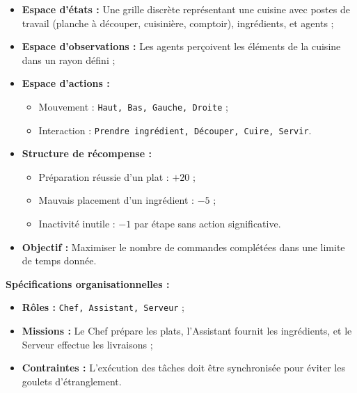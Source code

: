 \documentclass[pdflatex,sn-mathphys-num]{sn-jnl}%
\theoremstyle{thmstyleone}%
\theoremstyle{thmstyletwo}%
\theoremstyle{thmstylethree}%
\begin{document}
\begin{itemize}
    \item \textbf{Espace d'états :} Une grille discrète représentant une cuisine avec postes de travail (planche à découper, cuisinière, comptoir), ingrédients, et agents ;
    \item \textbf{Espace d'observations :} Les agents perçoivent les éléments de la cuisine dans un rayon défini ;
    \item \textbf{Espace d'actions :}
          \begin{itemize}
              \item Mouvement : \texttt{Haut, Bas, Gauche, Droite} ;
              \item Interaction : \texttt{Prendre ingrédient, Découper, Cuire, Servir}.
          \end{itemize}
    \item \textbf{Structure de récompense :}
          \begin{itemize}
              \item Préparation réussie d'un plat : $+20$ ;
              \item Mauvais placement d'un ingrédient : $-5$ ;
              \item Inactivité inutile : $-1$ par étape sans action significative.
          \end{itemize}
    \item \textbf{Objectif :} Maximiser le nombre de commandes complétées dans une limite de temps donnée.
\end{itemize}

\textbf{Spécifications organisationnelles :}
\begin{itemize}
    \item \textbf{Rôles :} \texttt{Chef, Assistant, Serveur} ;
    \item \textbf{Missions :} Le Chef prépare les plats, l'Assistant fournit les ingrédients, et le Serveur effectue les livraisons ;
    \item \textbf{Contraintes :} L'exécution des tâches doit être synchronisée pour éviter les goulets d'étranglement.
\end{itemize}
\end{document}
